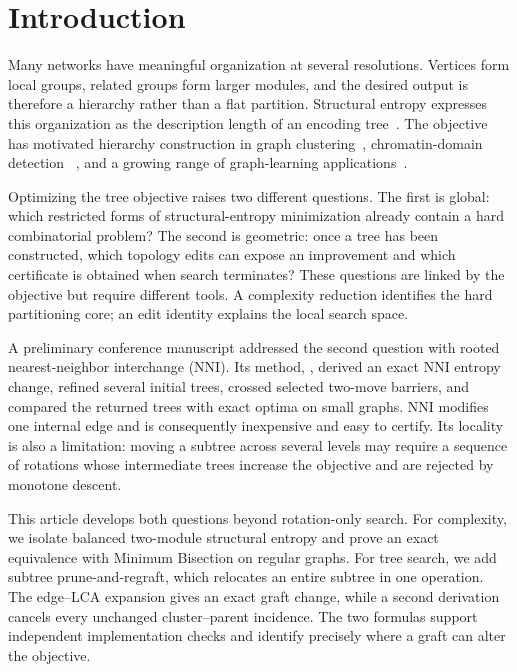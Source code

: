\section{Introduction}\label{sec:introduction}

Many networks have meaningful organization at several resolutions. Vertices
form local groups, related groups form larger modules, and the desired output
is therefore a hierarchy rather than a flat partition. Structural entropy
expresses this organization as the description length of an encoding
tree~\cite{li2016}. The objective has motivated hierarchy construction in
graph clustering~\cite{pan2025}, chromatin-domain detection
~\cite{zhang2021supertad}, and a growing range of graph-learning
applications~\cite{su2025survey}.

Optimizing the tree objective raises two different questions. The first is
global: which restricted forms of structural-entropy minimization already
contain a hard combinatorial problem? The second is geometric: once a tree has
been constructed, which topology edits can expose an improvement and which
certificate is obtained when search terminates? These questions are linked by
the objective but require different tools. A complexity reduction identifies
the hard partitioning core; an edit identity explains the local search space.

A preliminary conference manuscript addressed the second question with
rooted nearest-neighbor interchange (NNI). Its method, \NEST, derived an exact
NNI entropy change, refined several initial trees, crossed selected two-move
barriers, and compared the returned trees with exact optima on small graphs.
NNI modifies one internal edge and is consequently inexpensive and easy to
certify. Its locality is also a limitation: moving a subtree across several
levels may require a sequence of rotations whose intermediate trees increase
the objective and are rejected by monotone descent.

This article develops both questions beyond rotation-only search. For
complexity, we isolate balanced two-module structural entropy and prove an
exact equivalence with Minimum Bisection on regular graphs. For tree search,
we add subtree prune-and-regraft, which relocates an entire subtree in one
operation. The edge--LCA expansion gives an exact graft change, while a second
derivation cancels every unchanged cluster--parent incidence. The two formulas
support independent implementation checks and identify precisely where a
graft can alter the objective.

